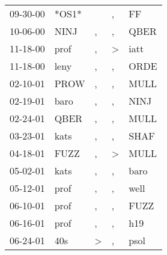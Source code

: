\begin{supertabular}{p{0.07\textwidth}p{0.06\textwidth}p{0.02\textwidth}p{0.02\textwidth}p{0.06\textwidth}}
          09-30-00\textsuperscript{} &                            *OS1* &                  &                , &             FF\textsuperscript{} \\
          10-06-00\textsuperscript{} &           NINJ\textsuperscript{} &                , &                , &           QBER\textsuperscript{} \\
          11-18-00\textsuperscript{} &           prof\textsuperscript{} &                , &     \textgreater &           iatt\textsuperscript{} \\
          11-18-00\textsuperscript{} &           leny\textsuperscript{} &                , &                , &           ORDE\textsuperscript{} \\
          02-10-01\textsuperscript{} &           PROW\textsuperscript{} &                , &                , &           MULL\textsuperscript{} \\
          02-19-01\textsuperscript{} &           baro\textsuperscript{} &                , &                , &           NINJ\textsuperscript{} \\
          02-24-01\textsuperscript{} &           QBER\textsuperscript{} &                , &                , &           MULL\textsuperscript{} \\
          03-23-01\textsuperscript{} &           kats\textsuperscript{} &                , &                , &           SHAF\textsuperscript{} \\
          04-18-01\textsuperscript{} &           FUZZ\textsuperscript{} &                , &     \textgreater &           MULL\textsuperscript{} \\
          05-02-01\textsuperscript{} &           kats\textsuperscript{} &                , &                , &           baro\textsuperscript{} \\
          05-12-01\textsuperscript{} &           prof\textsuperscript{} &                , &                , &           well\textsuperscript{} \\
          06-10-01\textsuperscript{} &           prof\textsuperscript{} &                , &                , &           FUZZ\textsuperscript{} \\
          06-16-01\textsuperscript{} &           prof\textsuperscript{} &                , &                , &            h19\textsuperscript{} \\
          06-24-01\textsuperscript{} &            40s\textsuperscript{} &     \textgreater &                , &           psol\textsuperscript{} \\

\end{supertabular}
